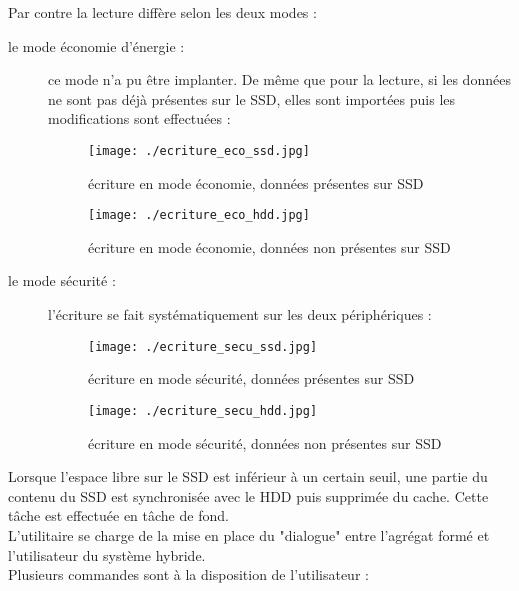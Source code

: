 \documentclass[a4paper,10pt]{article}
\begin{document}
Par contre la lecture diffère selon les deux modes : 
\begin{description}
 \item [le mode économie d'énergie : ] ce mode n'a pu être implanter. De même que pour la lecture, si les données ne sont pas déjà présentes sur le SSD, 
elles sont importées puis les modifications sont effectuées :
\begin{figure}[h]
 \begin{center}
  \texttt{[image: ./ecriture\_eco\_ssd.jpg]}
  \caption{écriture en mode économie, données présentes sur SSD}
 \end{center}
\end{figure}
\begin{figure}[h]
 \begin{center}
  \texttt{[image: ./ecriture\_eco\_hdd.jpg]}
  \caption{écriture en mode économie, données non présentes sur SSD}
 \end{center}
\end{figure}
\pagebreak
 \item [le mode sécurité :] l'écriture se fait systématiquement sur les deux périphériques : 
\begin{figure}[h]
 \begin{center}
  \texttt{[image: ./ecriture\_secu\_ssd.jpg]}
  \caption{écriture en mode sécurité, données présentes sur SSD}
 \end{center}
\end{figure}
\begin{figure}[h]
 \begin{center}
  \texttt{[image: ./ecriture\_secu\_hdd.jpg]}
  \caption{écriture en mode sécurité, données non présentes sur SSD}
 \end{center}
\end{figure}
\end{description}
Lorsque l'espace libre sur le SSD est inférieur à un certain seuil, une partie du contenu du SSD est synchronisée avec le HDD puis supprimée du cache.
Cette tâche est effectuée en tâche de fond.\medskip\\
L'utilitaire se charge de la mise en place du "dialogue" entre l'agrégat formé et l'utilisateur du système hybride.\medskip\\
Plusieurs commandes sont à la disposition de l'utilisateur : 
\end{document}
